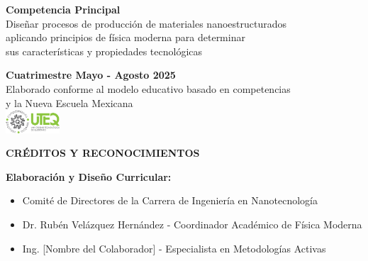 \begin{tecnologiabox}
\begin{tecnologiabox}
\begin{tecnologiabox}
\begin{teknologiabox}
\begin{tecnologiabox}
\begin{tecnologiabox}
\begin{tecnologiabox}
\begin{titlepage}
\begin{center}
	\vspace{1cm}
	
	\begin{tcolorbox}[colback=uteqgreen!10!white,colframe=uteqgreen,width=14cm]
		\begin{center}
			\textbf{Competencia Principal}\\[0.3cm]
			\small{Diseñar procesos de producción de materiales nanoestructurados\\
				aplicando principios de física moderna para determinar\\
				sus características y propiedades tecnológicas}
		\end{center}
	\end{tcolorbox}
	
	\vfill
	
	{\normalsize \textcolor{uteqgray}{\textbf{Cuatrimestre Mayo - Agosto 2025}}}\\[0.5cm]
	{\small \textcolor{uteqgray}{Elaborado conforme al modelo educativo basado en competencias}}\\
	{\small \textcolor{uteqgray}{y la Nueva Escuela Mexicana}}\\[1cm]
	
	\includegraphics[width=2cm]{../../Imagenes/Logo_uteq}
	
\end{center}
\end{titlepage}

\thispagestyle{empty}
\vspace*{1cm}

\begin{center}
\textbf{\Large CRÉDITOS Y RECONOCIMIENTOS}
\end{center}

\vspace{1cm}

\textbf{Elaboración y Diseño Curricular:}
\begin{itemize}[leftmargin=2cm]
\item Comité de Directores de la Carrera de Ingeniería en Nanotecnología
\item Dr. Rubén Velázquez Hernández - Coordinador Académico de Física Moderna
\item Ing. [Nombre del Colaborador] - Especialista en Metodologías Activas
\end{itemize}


\end{tecnologiabox}
\end{tecnologiabox}
\end{tecnologiabox}
\end{teknologiabox}
\end{tecnologiabox}
\end{tecnologiabox}
\end{tecnologiabox}

